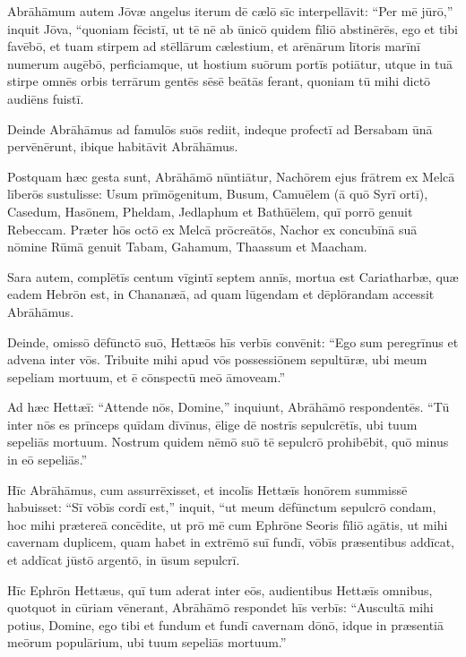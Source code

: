 \Versus Abrāhāmum autem Jōvæ angelus iterum dē cælō sīc interpellāvit:
\Versus ``Per mē jūrō,'' inquit Jōva, ``quoniam fēcistī, ut tē nē ab ūnicō quidem fīliō abstinērēs,
\Versus ego et tibi favēbō, et tuam stirpem ad stēllārum cælestium, et arēnārum lītoris marīnī numerum augēbō, perficiamque, ut hostium suōrum portīs potiātur,
\Versus utque in tuā stirpe omnēs orbis terrārum gentēs sēsē beātās ferant, quoniam tū mihi dictō audiēns fuistī.

\Versus Deinde Abrāhāmus ad famulōs suōs rediit, indeque profectī ad Bersabam ūnā pervēnērunt, ibique habitāvit Abrāhāmus.

\Versus Postquam hæc gesta sunt, Abrāhāmō nūntiātur, Nachōrem ejus frātrem ex Melcā līberōs sustulisse:
\Versus Usum prīmōgenitum, Busum, Camuēlem (ā quō Syrī ortī),
\Versus Casedum, Hasōnem, Pheldam, Jedlaphum et Bathūēlem,
\Versus quī porrō genuit Rebeccam. Præter hōs octō ex Melcā prōcreātōs,
\Versus Nachor ex concubīnā suā nōmine Rūmā genuit Tabam, Gahamum, Thaassum et Maacham.



\Caput
\Versus Sara autem, complētīs centum vīgintī septem annīs,
\Versus mortua est Cariatharbæ, quæ eadem Hebrōn est, in Chananæā, ad quam lūgendam et dēplōrandam accessit Abrāhāmus.

\Versus Deinde, omissō dēfūnctō suō, Hettæōs hīs verbīs convēnit:
\Versus ``Ego sum peregrīnus et advena inter vōs. Tribuite mihi apud vōs possessiōnem sepultūræ, ubi meum sepeliam mortuum, et ē cōnspectū meō āmoveam.''

\Versus Ad hæc Hettæī:
\Versus ``Attende nōs, Domine,'' inquiunt, Abrāhāmō respondentēs. ``Tū inter nōs es prīnceps quīdam dīvīnus, ēlige dē nostrīs sepulcrētīs, ubi tuum sepeliās mortuum. Nostrum quidem nēmō suō tē sepulcrō prohibēbit, quō minus in eō sepeliās.''

\Versus Hīc Abrāhāmus, cum assurrēxisset, et incolīs Hettæīs honōrem summissē habuisset:
\Versus ``Sī vōbīs cordī est,'' inquit, ``ut meum dēfūnctum sepulcrō condam, hoc mihi prætereā concēdite, ut prō mē cum Ephrōne Seoris fīliō agātis,
\Versus ut mihi cavernam duplicem, quam habet in extrēmō suī fundī, vōbīs præsentibus addīcat, et addīcat jūstō argentō, in ūsum sepulcrī.

\Versus Hīc Ephrōn Hettæus, quī tum aderat inter eōs, audientibus Hettæīs omnibus, quotquot in cūriam vēnerant, Abrāhāmō respondet hīs verbīs:
\Versus ``Auscultā mihi potius, Domine, ego tibi et fundum et fundī cavernam dōnō, idque in præsentiā meōrum populārium, ubi tuum sepeliās mortuum.''

